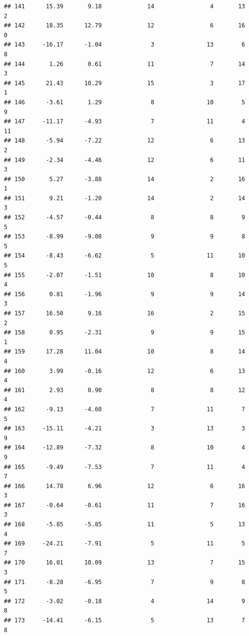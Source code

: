 \documentclass[]{book}
\begin{document}
\begin{verbatim}
## 141      15.39       9.18             14                4       13          2
## 142      18.35      12.79             12                6       16          0
## 143     -16.17      -1.04              3               13        6          8
## 144       1.26       0.61             11                7       14          3
## 145      21.43      10.29             15                3       17          1
## 146      -3.61       1.29              8               10        5          9
## 147     -11.17      -4.93              7               11        4         11
## 148      -5.94      -7.22             12                6       13          2
## 149      -2.34      -4.46             12                6       11          3
## 150       5.27      -3.88             14                2       16          1
## 151       9.21      -1.20             14                2       14          3
## 152      -4.57      -0.44              8                8        9          5
## 153      -8.99      -9.08              9                9        8          5
## 154      -8.43      -6.62              5               11       10          5
## 155      -2.07      -1.51             10                8       10          4
## 156       0.81      -1.96              9                9       14          3
## 157      16.50       9.16             16                2       15          2
## 158       0.95      -2.31              9                9       15          1
## 159      17.28      11.04             10                8       14          4
## 160       3.99      -0.16             12                6       13          4
## 161       2.93       0.90              8                8       12          4
## 162      -9.13      -4.60              7               11        7          5
## 163     -15.11      -4.21              3               13        3          9
## 164     -12.89      -7.32              8               10        4          9
## 165      -9.49      -7.53              7               11        4          7
## 166      14.78       6.96             12                6       16          3
## 167      -0.64      -0.61             11                7       16          3
## 168      -5.85      -5.85             11                5       13          4
## 169     -24.21      -7.91              5               11        5          7
## 170      16.01      10.09             13                7       15          3
## 171      -8.28      -6.95              7                9        8          5
## 172      -3.02      -0.18              4               14        9          8
## 173     -14.41      -6.15              5               13        7          8

\end{verbatim}
\end{document}
